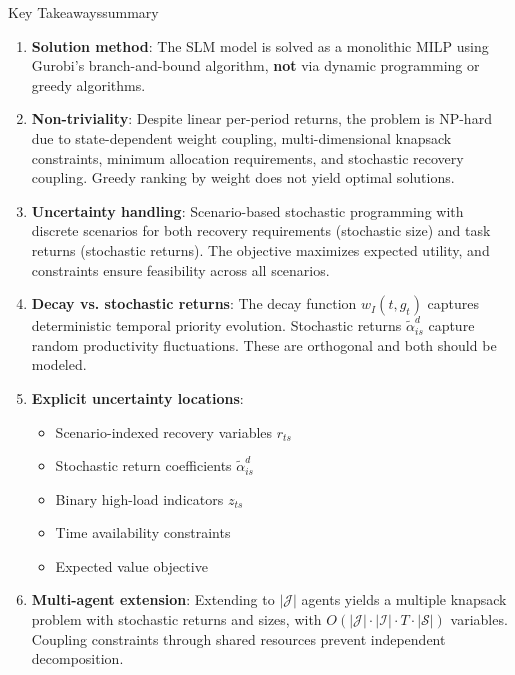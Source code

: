 \documentclass[11pt,a4paper]{article}
\begin{document}
\begin{keyconcept}{Key Takeaways}{summary}
\begin{enumerate}
    \item \textbf{Solution method}: The SLM model is solved as a monolithic MILP using Gurobi's branch-and-bound algorithm, \textbf{not} via dynamic programming or greedy algorithms.
    
    \item \textbf{Non-triviality}: Despite linear per-period returns, the problem is NP-hard due to state-dependent weight coupling, multi-dimensional knapsack constraints, minimum allocation requirements, and stochastic recovery coupling. Greedy ranking by weight does not yield optimal solutions.
    
    \item \textbf{Uncertainty handling}: Scenario-based stochastic programming with discrete scenarios for both recovery requirements (stochastic size) and task returns (stochastic returns). The objective maximizes expected utility, and constraints ensure feasibility across all scenarios.
    
    \item \textbf{Decay vs. stochastic returns}: The decay function $w_I(t, g_t)$ captures deterministic temporal priority evolution. Stochastic returns $\tilde{\alpha}_{is}^d$ capture random productivity fluctuations. These are orthogonal and both should be modeled.
    
    \item \textbf{Explicit uncertainty locations}:
    \begin{itemize}
        \item Scenario-indexed recovery variables $r_{ts}$
        \item Stochastic return coefficients $\tilde{\alpha}_{is}^d$
        \item Binary high-load indicators $z_{ts}$
        \item Time availability constraints
        \item Expected value objective
    \end{itemize}
    
    \item \textbf{Multi-agent extension}: Extending to $|\mathcal{J}|$ agents yields a multiple knapsack problem with stochastic returns and sizes, with $O(|\mathcal{J}| \cdot |\mathcal{I}| \cdot T \cdot |\mathcal{S}|)$ variables. Coupling constraints through shared resources prevent independent decomposition.
    

\end{enumerate}
\end{keyconcept}
\end{document}
